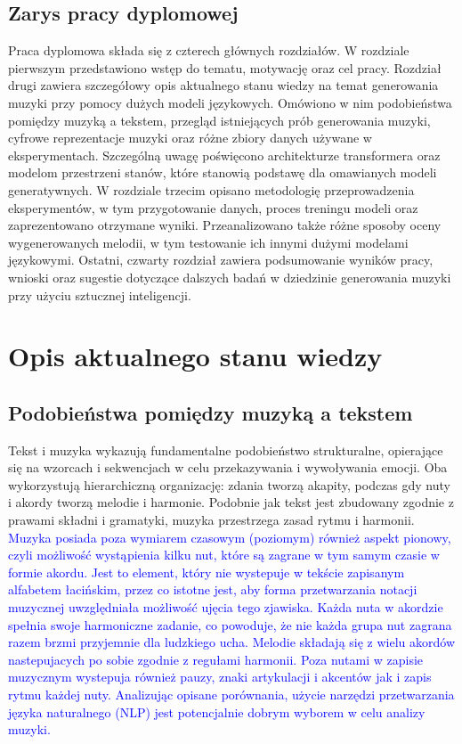 \documentclass[data-science]{agh-wi} %
\begin{document}
\section{Zarys pracy dyplomowej}
Praca dyplomowa składa się z czterech głównych rozdziałów. W rozdziale pierwszym przedstawiono wstęp do tematu, motywację oraz cel pracy. Rozdział drugi zawiera szczegółowy opis aktualnego stanu wiedzy na temat generowania muzyki przy pomocy dużych modeli językowych. Omówiono w nim podobieństwa pomiędzy muzyką a tekstem, przegląd istniejących prób generowania muzyki, cyfrowe reprezentacje muzyki oraz różne zbiory danych używane w eksperymentach. Szczególną uwagę poświęcono architekturze transformera oraz modelom przestrzeni stanów, które stanowią podstawę dla omawianych modeli generatywnych. W rozdziale trzecim opisano metodologię przeprowadzenia eksperymentów, w tym przygotowanie danych, proces treningu modeli oraz zaprezentowano otrzymane wyniki. Przeanalizowano także różne sposoby oceny wygenerowanych melodii, w tym testowanie ich innymi dużymi modelami językowymi. Ostatni, czwarty rozdział zawiera podsumowanie wyników pracy, wnioski oraz sugestie dotyczące dalszych badań w dziedzinie generowania muzyki przy użyciu sztucznej inteligencji.

\chapter{Opis aktualnego stanu wiedzy}
\section{Podobieństwa pomiędzy muzyką a tekstem}
Tekst i muzyka wykazują fundamentalne podobieństwo strukturalne, opierające się na wzorcach i sekwencjach w celu przekazywania i wywoływania emocji. Oba wykorzystują hierarchiczną organizację: zdania tworzą akapity, podczas gdy nuty i akordy tworzą melodie i harmonie. Podobnie jak tekst jest zbudowany zgodnie z prawami składni i gramatyki, muzyka przestrzega zasad rytmu i harmonii. \textcolor{blue}{Muzyka posiada poza wymiarem czasowym (poziomym) również aspekt pionowy, czyli możliwość wystąpienia kilku nut, które są zagrane w tym samym czasie w formie akordu. Jest to element, który nie wystepuje w tekście zapisanym alfabetem łacińskim, przez co istotne jest, aby forma przetwarzania notacji muzycznej uwzględniała możliwość ujęcia tego zjawiska. Każda nuta w akordzie spełnia swoje harmoniczne zadanie, co powoduje, że nie każda grupa nut zagrana razem brzmi przyjemnie dla ludzkiego ucha. Melodie składają się z wielu akordów nastepujacych po sobie zgodnie z regułami harmonii. Poza nutami w zapisie muzycznym wystepuja również pauzy, znaki artykulacji i akcentów jak i zapis rytmu każdej nuty. Analizując opisane porównania, użycie narzędzi przetwarzania języka naturalnego (NLP) jest potencjalnie dobrym wyborem w celu analizy muzyki.}
\end{document}
